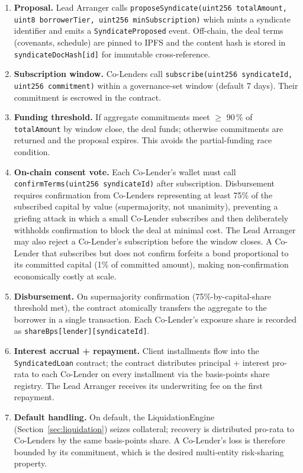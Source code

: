 \documentclass[12pt,a4paper]{report}
\begin{document}
\begin{enumerate}[noitemsep]
\item \textbf{Proposal.} Lead Arranger calls \texttt{proposeSyndicate(uint256 totalAmount, uint8 borrowerTier, uint256 minSubscription)} which mints a syndicate identifier and emits a \texttt{SyndicateProposed} event. Off-chain, the deal terms (covenants, schedule) are pinned to IPFS and the content hash is stored in \texttt{syndicateDocHash[id]} for immutable cross-reference.
\item \textbf{Subscription window.} Co-Lenders call \texttt{subscribe(uint256 syndicateId, uint256 commitment)} within a governance-set window (default 7 days). Their commitment is escrowed in the contract.
\item \textbf{Funding threshold.} If aggregate commitments meet $\ge$ 90\,\% of \texttt{totalAmount} by window close, the deal funds; otherwise commitments are returned and the proposal expires. This avoids the partial-funding race condition.
\item \textbf{On-chain consent vote.} Each Co-Lender's wallet must call \texttt{confirmTerms(uint256 syndicateId)} after subscription. Disbursement requires confirmation from Co-Lenders representing at least 75\% of the subscribed capital by value (supermajority, not unanimity), preventing a griefing attack in which a small Co-Lender subscribes and then deliberately withholds confirmation to block the deal at minimal cost. The Lead Arranger may also reject a Co-Lender's subscription before the window closes. A Co-Lender that subscribes but does not confirm forfeits a bond proportional to its committed capital (1\% of committed amount), making non-confirmation economically costly at scale.
\item \textbf{Disbursement.} On supermajority confirmation (75\%-by-capital-share threshold met), the contract atomically transfers the aggregate to the borrower in a single transaction. Each Co-Lender's exposure share is recorded as \texttt{shareBps[lender][syndicateId]}.
\item \textbf{Interest accrual + repayment.} Client installments flow into the \texttt{SyndicatedLoan} contract; the contract distributes principal + interest pro-rata to each Co-Lender on every installment via the basis-points share registry. The Lead Arranger receives its underwriting fee on the first repayment.
\item \textbf{Default handling.} On default, the LiquidationEngine (Section~\ref{sec:liquidation}) seizes collateral; recovery is distributed pro-rata to Co-Lenders by the same basis-points share. A Co-Lender's loss is therefore bounded by its commitment, which is the desired multi-entity risk-sharing property.
\end{enumerate}
\end{document}
